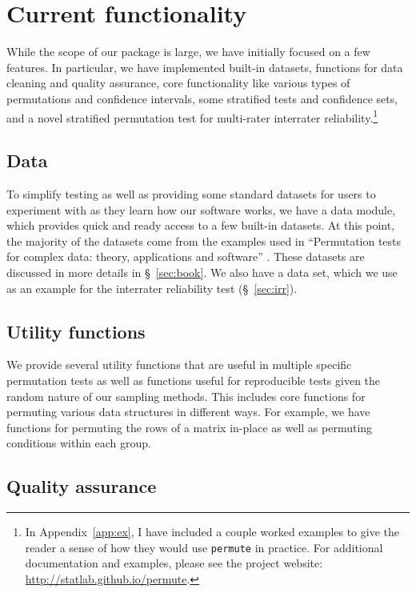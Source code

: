 \chapter{\label{ch:func}Current functionality}

While the scope of our package is large, we have initially focused on a few
features.  In particular, we have implemented built-in datasets, functions for
data cleaning and quality assurance, core functionality like various types of
permutations and confidence intervals, some stratified tests and confidence
sets, and a novel stratified permutation test for multi-rater interrater
reliability.\footnote{In Appendix~\ref{app:ex}, I have included a couple
worked examples to give the reader a sense of how they would use \texttt{permute}
in practice.
For additional documentation and examples, please see the project website:
\url{http://statlab.github.io/permute}.}

\section{Data}

To simplify testing as well as providing some standard datasets for
users to experiment with as they learn how our software works, we
have a data module, which provides quick and ready access to a few
built-in datasets. At this point, the majority of the datasets come
from the examples used in ``Permutation tests for complex data: theory,
applications and software'' \cite{pesarin2010permutation}.  These
datasets are discussed in more details in \S~\ref{sec:book}.  We also
have a data set, which we use as an example for the interrater
reliability test (\S~\ref{sec:irr}).

\section{Utility functions}

We provide several utility functions that are useful in multiple specific
permutation tests as well as functions useful for reproducible tests
given the random nature of our sampling methods.
This includes core functions for permuting various data structures in different
ways.  For example, we have functions for permuting the rows of a matrix
in-place as well as permuting conditions within each group.

\section{Quality assurance}

